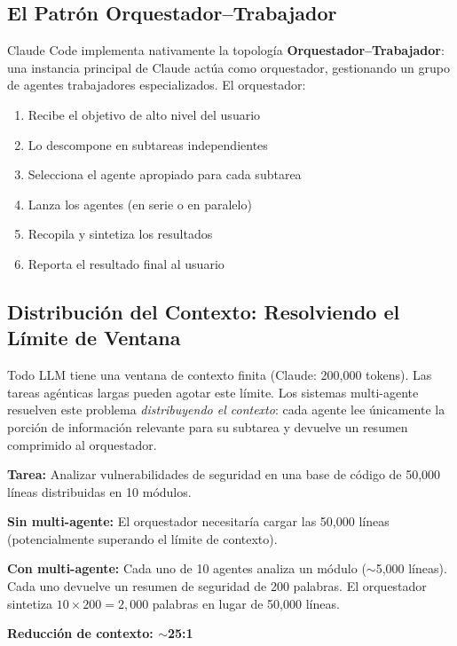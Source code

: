 \documentclass[11pt,letterpaper]{article}
\begin{document}
\subsection{El Patrón Orquestador--Trabajador}

Claude Code implementa nativamente la topología \textbf{Orquestador--Trabajador}: una instancia principal de Claude actúa como orquestador, gestionando un grupo de agentes trabajadores especializados. El orquestador:

\begin{enumerate}[leftmargin=*]
    \item Recibe el objetivo de alto nivel del usuario
    \item Lo descompone en subtareas independientes
    \item Selecciona el agente apropiado para cada subtarea
    \item Lanza los agentes (en serie o en paralelo)
    \item Recopila y sintetiza los resultados
    \item Reporta el resultado final al usuario
\end{enumerate}

\subsection{Distribución del Contexto: Resolviendo el Límite de Ventana}

Todo LLM tiene una ventana de contexto finita (Claude: 200,000 tokens). Las tareas agénticas largas pueden agotar este límite. Los sistemas multi-agente resuelven este problema \emph{distribuyendo el contexto}: cada agente lee únicamente la porción de información relevante para su subtarea y devuelve un resumen comprimido al orquestador.

\begin{examplebox}[title=Distribución de Contexto en la Práctica]
\textbf{Tarea:} Analizar vulnerabilidades de seguridad en una base de código de 50,000 líneas distribuidas en 10 módulos.

\textbf{Sin multi-agente:} El orquestador necesitaría cargar las 50,000 líneas (potencialmente superando el límite de contexto).

\textbf{Con multi-agente:} Cada uno de 10 agentes analiza un módulo ($\sim$5,000 líneas). Cada uno devuelve un resumen de seguridad de 200 palabras. El orquestador sintetiza $10 \times 200 = 2,000$ palabras en lugar de 50,000 líneas.

\textbf{Reducción de contexto: $\sim$25:1}
\end{examplebox}
\end{document}
